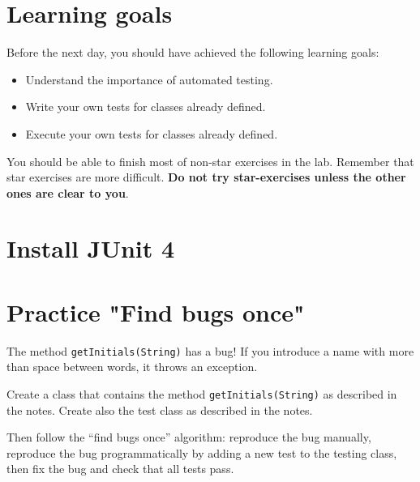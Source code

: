 \documentclass{article}
\begin{document}
\section*{Learning goals}
\label{sec:learning-goals}

Before the next day, you should have achieved the following learning
goals: 

\begin{itemize}
\item Understand the importance of automated testing. 
\item Write your own tests for classes already defined. 
\item Execute your own tests for classes already defined. 
\end{itemize}

You should be able to finish most of non-star exercises in the lab. 
Remember that star exercises are more difficult. 
\textbf{Do not try star-exercises unless the other ones are clear to
  you}.  


\section{Install JUnit 4}
\label{sec:install-junit-4}


\section{Practice "Find bugs once"}
\label{sec:practice-find-bugs}

The method \verb+getInitials(String)+ has a bug! If you introduce a
name with more than space between words, it throws an exception.

Create a class that contains the method \verb+getInitials(String)+ as
described in the notes. Create also the test class as described in the
notes. 

Then follow the ``find bugs once'' algorithm: reproduce the bug manually,
reproduce the bug programmatically by adding a new test to the testing
class, then fix the bug and check that all tests pass. 
\end{document}
